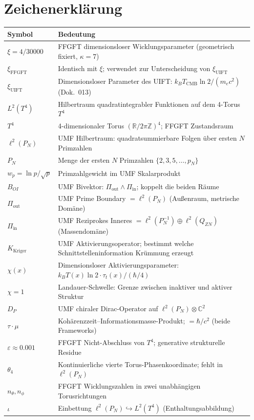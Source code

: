 \section*{Zeichenerklärung}

\begin{center}
\renewcommand{\arraystretch}{1.4}
{\small
\begin{tabular}{p{3.5cm}p{9cm}}
\toprule
\textbf{Symbol} & \textbf{Bedeutung} \\
\midrule
$\xi = 4/30000$ & FFGFT dimensionsloser Wicklungsparameter (geometrisch fixiert, $\kappa=7$) \\
$\xi_\text{FFGFT}$ & Identisch mit $\xi$; verwendet zur Unterscheidung von $\xi_\text{UIFT}$ \\
$\xi_\text{UIFT}$ & Dimensionsloser Parameter des UIFT: $k_BT_\text{CMB}\ln 2/(m_ec^2)$ (Dok.~013) \\
$L^2(T^4)$ & Hilbertraum quadratintegrabler Funktionen auf dem 4-Torus $T^4$ \\
$T^4$ & 4-dimensionaler Torus $(\mathbb{R}/2\pi\mathbb{Z})^4$; FFGFT Zustandsraum \\
$\ell^2(P_N)$ & UMF Hilbertraum: quadratsummierbare Folgen über ersten $N$ Primzahlen \\
$P_N$ & Menge der ersten $N$ Primzahlen $\{2,3,5,\ldots,p_N\}$ \\
$w_p = \ln p/\sqrt{p}$ & Primzahlgewicht im UMF Skalarprodukt \\
$B_{OI}$ & UMF Bivektor: $\Pi_\text{out} \wedge \Pi_\text{in}$; koppelt die beiden Räume \\
$\Pi_\text{out}$ & UMF Prime Boundary $= \ell^2(P_N)$ (Außenraum, metrische Domäne) \\
$\Pi_\text{in}$ & UMF Reziprokes Inneres $= \ell^2(P_N^{-1}) \oplus \ell^2(Q_{ZN})$ (Massendomäne) \\
$K_\text{Kriger}$ & UMF Aktivierungsoperator; bestimmt welche Schnittstelleninformation Krümmung erzeugt \\
$\chi(x)$ & Dimensionsloser Aktivierungsparameter: $k_BT(x)\ln2\cdot\tau_t(x)/(\hbar/4)$ \\
$\chi = 1$ & Landauer-Schwelle: Grenze zwischen inaktiver und aktiver Struktur \\
$D_P$ & UMF chiraler Dirac-Operator auf $\ell^2(P_N)\otimes\mathbb{C}^2$ \\
$\tau\cdot\mu$ & Kohärenzzeit--Informationsmasse-Produkt; $= \hbar/c^2$ (beide Frameworks) \\
$\varepsilon \approx 0.001$ & FFGFT Nicht-Abschluss von $T^4$; generative strukturelle Residue \\
$\theta_4$ & Kontinuierliche vierte Torus-Phasenkoordinate; fehlt in $\ell^2(P_N)$ \\
$n_\theta, n_\phi$ & FFGFT Wicklungszahlen in zwei unabhängigen Torusrichtungen \\
$\iota$ & Einbettung $\ell^2(P_N) \hookrightarrow L^2(T^4)$ (Enthaltungsabbildung) \\
\bottomrule
\end{tabular}
}
\end{center}


